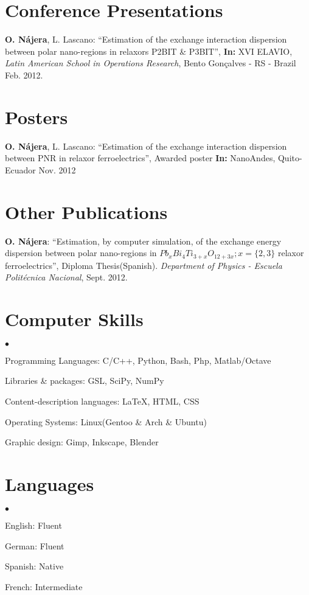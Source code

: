 \documentclass[margin,line]{res}
\newenvironment{list2}{
  \begin{list}{$\bullet$}{%
      \setlength{\itemsep}{0in}
      \setlength{\parsep}{0in} \setlength{\parskip}{0in}
      \setlength{\topsep}{0in} \setlength{\partopsep}{0in} 
      \setlength{\leftmargin}{0.2in}}}{\end{list}}
\begin{document}
\begin{resume}
\section{\sc Conference Presentations}
  {\bf O. Nájera}, L. Lascano: ``Estimation of the exchange interaction dispersion between polar
  nano-regions in relaxors P2BIT \& P3BIT'', {\bf In:} XVI ELAVIO, {\em Latin American School in Operations Research}, Bento Gonçalves - RS - Brazil Feb. 2012.

\section{\sc Posters}
  {\bf O. Nájera}, L. Lascano: ``Estimation of the exchange interaction dispersion between PNR in
  relaxor ferroelectrics'',  Awarded poster {\bf In:} NanoAndes, Quito-Ecuador Nov. 2012

\section{\sc Other Publications}
  {\bf O. Nájera}: ``Estimation, by computer simulation, of the exchange energy dispersion between
  polar nano-regions in $Pb_xBi_4Ti_{3+x}O_{12+3x}; x=\{2,3\}$ relaxor ferroelectrics'', Diploma
  Thesis(Spanish). {\em Department of Physics - Escuela Politécnica Nacional}, Sept. 2012.

\section{\sc Computer Skills}
  \begin{list2}
    \item Programming Languages:  C/C++, Python, Bash, Php, Matlab/Octave
    \item Libraries \& packages: GSL, SciPy, NumPy
    \item Content-description languages: \LaTeX, HTML, CSS
    \item Operating Systems:  Linux(Gentoo \& Arch \& Ubuntu)
    \item Graphic design: Gimp, Inkscape, Blender
  \end{list2}

\section{\sc Languages}
  \begin{list2}
    \item English: Fluent
    \item German: Fluent
    \item Spanish: Native
    \item French: Intermediate
  \end{list2}
  

\end{resume}
\end{document}
